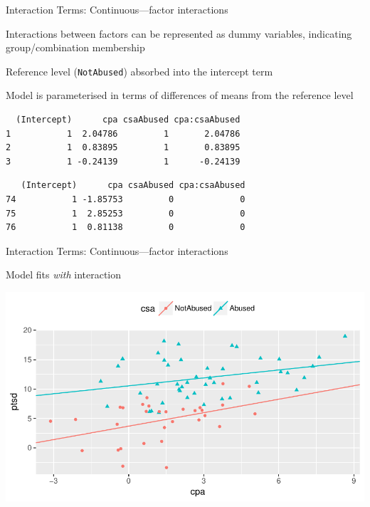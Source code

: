 \documentclass[10pt,ignorenonframetext,compress, aspectratio=169]{beamer}
\begin{document}
\begin{frame}[fragile]{Interaction Terms: Continuous---factor
interactions}

Interactions between factors can be represented as \alert{dummy}
variables, indicating group/combination membership

Reference level (\texttt{NotAbused}) absorbed into the intercept term

Model is parameterised in terms of differences of means from the
reference level

\scriptsize

\begin{verbatim}
  (Intercept)      cpa csaAbused cpa:csaAbused
1           1  2.04786         1       2.04786
2           1  0.83895         1       0.83895
3           1 -0.24139         1      -0.24139
\end{verbatim}

\begin{verbatim}
   (Intercept)      cpa csaAbused cpa:csaAbused
74           1 -1.85753         0             0
75           1  2.85253         0             0
76           1  0.81138         0             0
\end{verbatim}

\normalsize

\end{frame}

\begin{frame}{Interaction Terms: Continuous---factor interactions}

Model fits \emph{with} interaction

\begin{center}\includegraphics[width=0.7\linewidth]{03-linear-models_files/figure-beamer/sex-abuse-plot-interaction-model-1} \end{center}

\end{frame}
\end{document}

